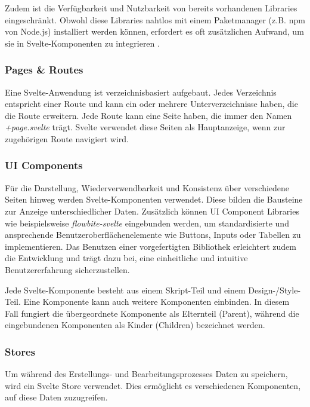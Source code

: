Zudem ist die Verfügbarkeit und Nutzbarkeit von bereits vorhandenen Libraries eingeschränkt. Obwohl diese Libraries nahtlos mit einem Paketmanager (z.B. npm von Node.js) installiert werden können, erfordert es oft zusätzlichen Aufwand, um sie in Svelte-Komponenten zu integrieren \autocite{SvelteVsSvelteKit2023}.

\subsubsection{Pages \& Routes}

Eine Svelte-Anwendung ist verzeichnisbasiert aufgebaut. Jedes Verzeichnis entspricht einer Route und kann ein oder mehrere Unterverzeichnisse haben, die die Route erweitern. Jede Route kann eine Seite haben, die immer den Namen \textit{+page.svelte} trägt. Svelte verwendet diese Seiten als Hauptanzeige, wenn zur zugehörigen Route navigiert wird.

\subsubsection{UI Components}

Für die Darstellung, Wiederverwendbarkeit und Konsistenz über verschiedene Seiten hinweg werden Svelte-Komponenten verwendet. Diese bilden die Bausteine zur Anzeige unterschiedlicher Daten. Zusätzlich können UI Component Libraries wie beispielsweise \textit{flowbite-svelte} eingebunden werden, um standardisierte und ansprechende Benutzeroberflächenelemente wie Buttons, Inputs oder Tabellen zu implementieren. Das Benutzen einer vorgefertigten Bibliothek erleichtert zudem die Entwicklung und trägt dazu bei, eine einheitliche und intuitive Benutzererfahrung sicherzustellen.

Jede Svelte-Komponente besteht aus einem Skript-Teil und einem Design-/Style-Teil. Eine Komponente kann auch weitere Komponenten einbinden. In diesem Fall fungiert die übergeordnete Komponente als Elternteil (Parent), während die eingebundenen Komponenten als Kinder (Children) bezeichnet werden.

\subsubsection{Stores}

Um während des Erstellungs- und Bearbeitungsprozesses Daten zu speichern, wird ein Svelte Store verwendet. Dies ermöglicht es verschiedenen Komponenten, auf diese Daten zuzugreifen.

